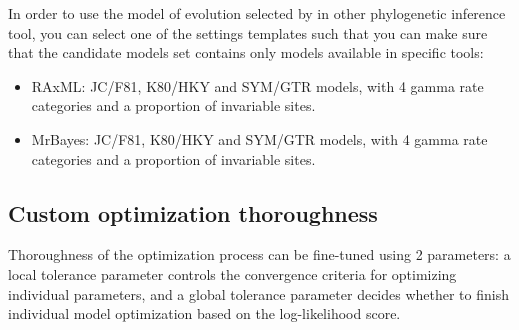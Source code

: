 In order to use the model of evolution selected by \modeltest in other phylogenetic inference tool,
you can select one of the settings templates such that you can make sure that the
candidate models set contains only models available in specific tools:

\begin{itemize}
  \item RAxML: JC/F81, K80/HKY and SYM/GTR models, with 4 gamma rate categories and a proportion of invariable sites.
  \item MrBayes: JC/F81, K80/HKY and SYM/GTR models, with 4 gamma rate categories and a proportion of invariable sites.
\end{itemize}

\subsection{Custom optimization thoroughness}
\label{sec:arg:thorough}

Thoroughness of the optimization process can be fine-tuned using 2 parameters:
a local tolerance parameter controls the convergence criteria for optimizing individual parameters,
and a global tolerance parameter decides whether to finish individual model optimization based on the log-likelihood score.
